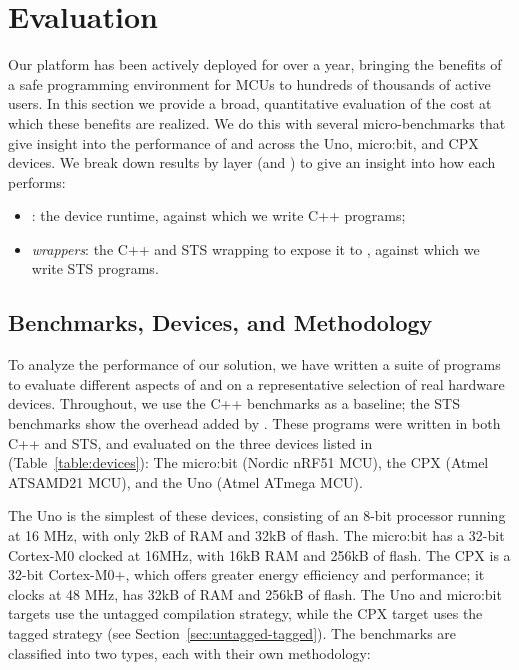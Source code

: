 \section{Evaluation}
\label{sec:evaluate}

Our platform has been actively deployed for over a year, bringing the benefits of a safe programming environment for MCUs to hundreds of thousands of active users. In this section we provide a broad, quantitative evaluation of the cost at which these benefits are realized. We do this with several micro-benchmarks that give insight into the performance of \MC and \CO across the Uno, micro:bit, and CPX devices. We break down results by layer (\CO and \MCN) to give an insight into how each performs:
\begin{itemize}
\item \emph{\CON}: the device runtime, against which we write C++ programs;
\item \emph{\MCN wrappers}: the C++ and STS wrapping \CO to expose it to \MCN, against which we write STS programs.
\end{itemize}

\subsection{Benchmarks, Devices, and Methodology}

To analyze the performance of our solution, we have written a suite of programs to evaluate different aspects of \MC and \CO  on a representative selection of real hardware devices. Throughout, we use the C++ \CO benchmarks as a baseline; the STS benchmarks show the overhead added by \MCN. These programs were written in both C++ and STS, and evaluated on the three devices listed in (Table~\ref{table:devices}): The micro:bit (Nordic nRF51 MCU), the CPX (Atmel ATSAMD21 MCU), and the Uno (Atmel ATmega MCU).

The Uno is the simplest of these devices,
consisting of an 8-bit processor running at 16 MHz, with only 2kB of RAM and 32kB of flash.
The micro:bit has a 32-bit Cortex-M0 clocked at 16MHz, with 16kB RAM and 256kB of flash. The CPX is a 32-bit Cortex-M0+, which offers greater energy efficiency and performance; it clocks at 48 MHz, has 32kB of RAM and 256kB of flash. The Uno and micro:bit \MC targets use the untagged compilation strategy, while the CPX target uses the tagged strategy (see Section~\ref{sec:untagged-tagged}). The benchmarks are classified into two types, each with their own methodology:


